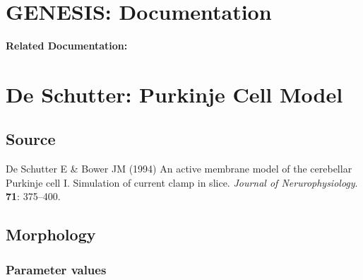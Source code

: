 \documentclass[12pt]{article}
\begin{document}
\section*{GENESIS: Documentation}

{\bf Related Documentation:}

\section*{De Schutter: Purkinje Cell Model}

\subsection*{Source}

De Schutter E \& Bower JM (1994) An active membrane model of the cerebellar Purkinje cell I. Simulation of current clamp in slice. {\it Journal of Nerurophysiology}. {\bf 71}: 375--400.

\subsection*{Morphology}

\subsubsection*{Parameter values}
\end{document}
